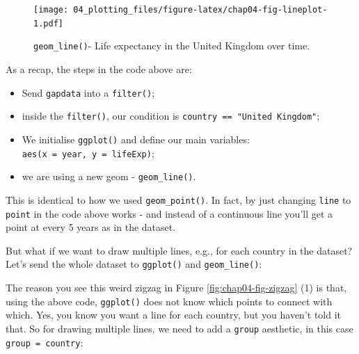 \documentclass[
  12pt,
  krantz2]{krantz}
\makeatletter
\newenvironment{Shaded}{\begin{snugshade}}{\end{snugshade}}
\newcommand{\DataTypeTok}[1]{\textcolor[rgb]{0.13,0.29,0.53}{#1}}
\newcommand{\KeywordTok}[1]{\textcolor[rgb]{0.13,0.29,0.53}{\textbf{#1}}}
\newcommand{\NormalTok}[1]{#1}
\newcommand{\OperatorTok}[1]{\textcolor[rgb]{0.81,0.36,0.00}{\textbf{#1}}}
\newcommand{\StringTok}[1]{\textcolor[rgb]{0.31,0.60,0.02}{#1}}
\providecommand{\tightlist}{%
  \setlength{\itemsep}{0pt}\setlength{\parskip}{0pt}}
\newenvironment{kframe}{%
\medskip{}
\setlength{\fboxsep}{.8em}
 \def\at@end@of@kframe{}%
 \ifinner\ifhmode%
  \def\at@end@of@kframe{\end{minipage}}%
  \begin{minipage}{\columnwidth}%
 \fi\fi%
 \def\FrameCommand##1{\hskip\@totalleftmargin \hskip-\fboxsep
 \colorbox{shadecolor}{##1}\hskip-\fboxsep
     \hskip-\linewidth \hskip-\@totalleftmargin \hskip\columnwidth}%
 \MakeFramed {\advance\hsize-\width
   \@totalleftmargin\z@ \linewidth\hsize
   \@setminipage}}%
 {\par\unskip\endMakeFramed%
 \at@end@of@kframe}
\renewenvironment{Shaded}{\begin{kframe}}{\end{kframe}}
\makeatother
\begin{document}
\begin{figure}
\centering
\texttt{[image: 04\_plotting\_files/figure-latex/chap04-fig-lineplot-1.pdf]}
\caption{\label{fig:chap04-fig-lineplot}\texttt{geom\_line()}- Life expectancy in the United Kingdom over time.}
\end{figure}

As a recap, the steps in the code above are:

\begin{itemize}
\tightlist
\item
  Send \texttt{gapdata} into a \texttt{filter()};
\item
  inside the \texttt{filter()}, our condition is \texttt{country\ ==\ "United\ Kingdom"};
\item
  We initialise \texttt{ggplot()} and define our main variables: \texttt{aes(x\ =\ year,\ y\ =\ lifeExp)};
\item
  we are using a new geom - \texttt{geom\_line()}.
\end{itemize}

This is identical to how we used \texttt{geom\_point()}.
In fact, by just changing \texttt{line} to \texttt{point} in the code above works - and instead of a continuous line you'll get a point at every 5 years as in the dataset.

But what if we want to draw multiple lines, e.g., for each country in the dataset?
Let's send the whole dataset to \texttt{ggplot()} and \texttt{geom\_line()}:

\begin{Shaded}
\end{Shaded}

The reason you see this weird zigzag in Figure \ref{fig:chap04-fig-zigzag} (1) is that, using the above code, \texttt{ggplot()} does not know which points to connect with which.
Yes, you know you want a line for each country, but you haven't told it that.
So for drawing multiple lines, we need to add a \texttt{group} aesthetic, in this case \texttt{group\ =\ country}:

\begin{Shaded}
\end{Shaded}
\end{document}
